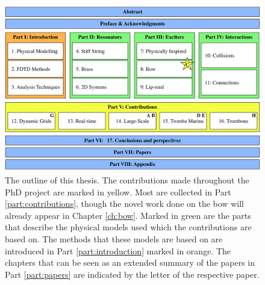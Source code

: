 \begin{figure}[h]
    \centering
    \includegraphics[width=\textwidth]{figures/intro/thesisOverview.pdf}
    \caption{\label{fig:thesisOutline} The outline of this thesis. The contributions made throughout the PhD project are marked in yellow. Most are collected in Part \ref{part:contributions}, though the novel work done on the bow will already appear in Chapter \ref{ch:bow}. Marked in green are the parts that describe the physical models used which the contributions are based on. The methods that these models are based on are introduced in Part \ref{part:introduction} marked in orange. The chapters that can be seen as an extended summary of the papers in Part \ref{part:papers} are indicated by the letter of the respective paper.}
\end{figure}